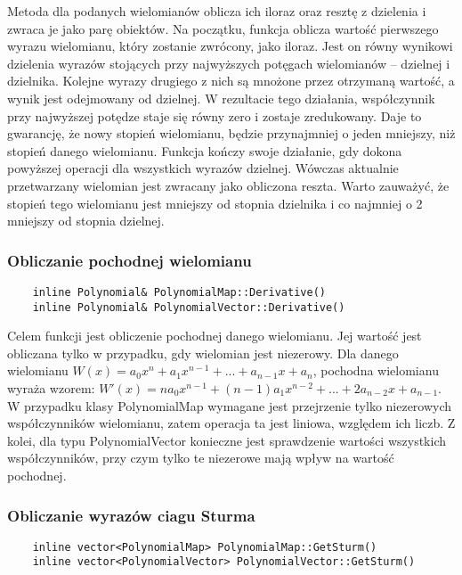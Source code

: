 \documentclass[oneside,a4paper]{book}
\begin{document}
	Metoda dla podanych wielomianów oblicza ich iloraz oraz resztę z dzielenia i zwraca je jako parę obiektów. Na początku, funkcja oblicza wartość pierwszego wyrazu wielomianu, który zostanie zwrócony, jako iloraz. Jest on równy wynikowi dzielenia wyrazów stojących przy najwyższych potęgach wielomianów – dzielnej i dzielnika. Kolejne wyrazy drugiego z nich są mnożone przez otrzymaną wartość, a wynik jest odejmowany od dzielnej. W rezultacie tego działania, współczynnik przy najwyższej potędze staje się równy zero i zostaje zredukowany. Daje to gwarancję, że nowy stopień wielomianu, będzie przynajmniej o jeden mniejszy, niż stopień danego wielomianu. Funkcja kończy swoje działanie, gdy dokona powyższej operacji dla wszystkich wyrazów dzielnej. Wówczas aktualnie przetwarzany wielomian jest zwracany jako obliczona reszta. Warto zauważyć, że stopień tego wielomianu jest mniejszy od stopnia dzielnika i co najmniej o 2 mniejszy od stopnia dzielnej.
	\\
	
	\subsubsection{Obliczanie pochodnej wielomianu}
	\begin{lstlisting}
	inline Polynomial& PolynomialMap::Derivative()
	inline Polynomial& PolynomialVector::Derivative()
	\end{lstlisting}
	
	Celem funkcji jest obliczenie pochodnej danego wielomianu. Jej wartość jest obliczana tylko w przypadku, gdy wielomian jest niezerowy. Dla danego wielomianu $W(x) = a_0x^n + a_1x^{n-1} + ... + a_{n-1}x + a_n$, pochodna wielomianu wyraża wzorem: $W'(x) = na_0x^{n-1} + (n-1)a_1x^{n-2} + ... + 2a_{n-2}x + a_{n-1}$. W przypadku klasy PolynomialMap wymagane jest przejrzenie tylko niezerowych współczynników wielomianu, zatem operacja ta jest liniowa, względem ich liczb. Z kolei, dla typu PolynomialVector konieczne jest sprawdzenie wartości wszystkich współczynników, przy czym tylko te niezerowe mają wpływ na wartość pochodnej.
	
	\subsubsection{Obliczanie wyrazów ciagu Sturma}
	\begin{lstlisting}
	inline vector<PolynomialMap> PolynomialMap::GetSturm()
	inline vector<PolynomialVector> PolynomialVector::GetSturm()
	\end{lstlisting}
	
\end{document}
